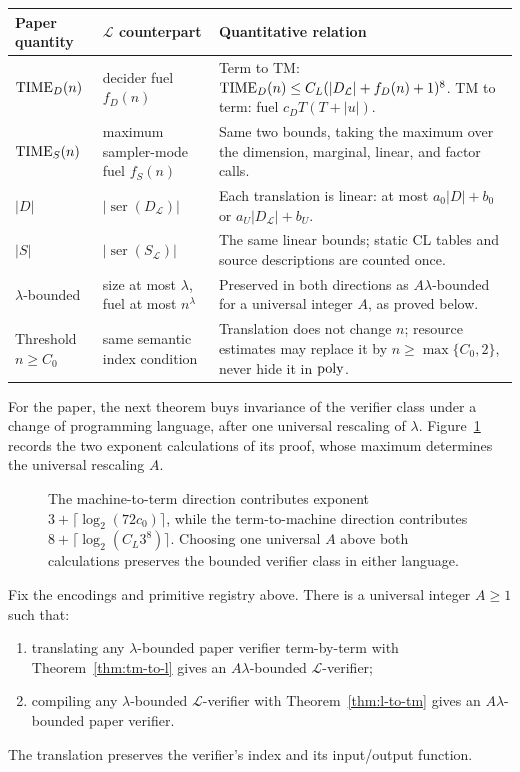 \begin{center}
\small
\begin{tabularx}{\textwidth}{P{0.18\textwidth}P{0.28\textwidth}X}
\toprule
Paper quantity & \(\mathcal L\) counterpart & Quantitative relation \\
\midrule
\(\operatorname{TIME}_D(n)\) & decider fuel \(f_D(n)\) & Term to TM:
\(\operatorname{TIME}_D(n)\leq C_L(|D_{\mathcal L}|+f_D(n)+1)^8\).  TM to term:
fuel \(c_DT(T+|u|)\). \\
\(\operatorname{TIME}_S(n)\) & maximum sampler-mode fuel \(f_S(n)\) & Same two bounds,
taking the maximum over the dimension, marginal, linear, and factor calls. \\
\(|D|\) & \(|\operatorname{ser}(D_{\mathcal L})|\) & Each translation is
linear: at most \(a_0|D|+b_0\) or \(a_U|D_{\mathcal L}|+b_U\). \\
\(|S|\) & \(|\operatorname{ser}(S_{\mathcal L})|\) & The same linear bounds;
static CL tables and source descriptions are counted once. \\
\(\lambda\)-bounded & size at most \(\lambda\), fuel at most \(n^\lambda\) &
Preserved in both directions as \(A\lambda\)-bounded for a universal integer
\(A\), as proved below. \\
Threshold \(n\geq C_0\) & same semantic index condition & Translation does not
change \(n\); resource estimates may replace it by
\(n\geq\max\{C_0,2\}\), never hide it in \(\operatorname{poly}\). \\
\bottomrule
\end{tabularx}
\end{center}


For the paper, the next theorem buys invariance of the verifier class under a
change of programming language, after one universal rescaling of \(\lambda\).
Figure~\ref{fig:lambda-preservation} records the two exponent calculations of
its proof, whose maximum determines the universal rescaling \(A\).
\begin{figure}[H]
\centering

\caption{The machine-to-term direction contributes exponent \(3+\lceil\log_2(72c_0)\rceil\), while the term-to-machine direction contributes \(8+\lceil\log_2(C_L3^8)\rceil\).  Choosing one universal \(A\) above both calculations preserves the bounded verifier class in either language.}
\label{fig:lambda-preservation}
\end{figure}

\begin{theorem}
\label{thm:lambda-preservation}\enspace%
Fix the encodings and primitive registry above.  There is a universal integer
\(A\geq1\) such that:
\begin{enumerate}
\item translating any \(\lambda\)-bounded paper verifier term-by-term with
Theorem~\ref{thm:tm-to-l} gives an \(A\lambda\)-bounded
\(\mathcal L\)-verifier;
\item compiling any \(\lambda\)-bounded \(\mathcal L\)-verifier with
Theorem~\ref{thm:l-to-tm} gives an \(A\lambda\)-bounded paper verifier.
\end{enumerate}
The translation preserves the verifier's index and its input/output function.
\end{theorem}

